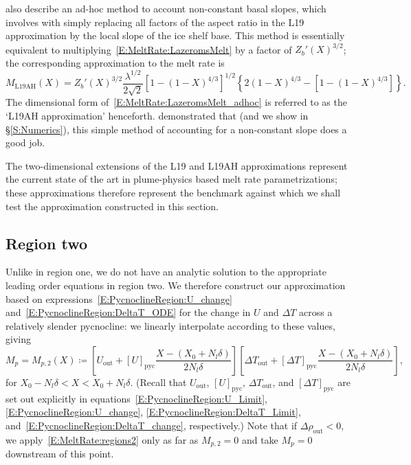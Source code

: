 \documentclass[openacc]{rsproca_new}%
\newcommand{\lt}{\delta} %
\newcommand{\out}{\text{out}}
\begin{document}
\cite{Lazeroms2019JPhysOcean} also describe an ad-hoc method to account non-constant basal slopes, which involves with simply replacing all factors of the aspect ratio in the L19 approximation by the local slope of the ice shelf base. This method is essentially equivalent to multiplying~\eqref{E:MeltRate:LazeromsMelt} by a factor of $Z_b'(X)^{3/2}$; the corresponding approximation to the melt rate is
\begin{equation}\label{E:MeltRate:LazeromsMelt_adhoc}
M_{\text{L19AH}}(X) =Z_b'(X)^{3/2} \frac{\lambda^{1/2}}{2\sqrt{2}}\left[1 - (1 - X)^{4/3}\right]^{1/2}\left\{2(1-X)^{4/3} - \left[1- (1 - X)^{4/3}\right]\right\}.
\end{equation}
The dimensional form of~\eqref{E:MeltRate:LazeromsMelt_adhoc} is referred to as the `L19AH approximation' henceforth. \cite{Lazeroms2019JPhysOcean} demonstrated that (and we show in \S\ref{S:Numerics}), this simple method of accounting for a non-constant slope does a good job. 

The two-dimensional extensions of the L19 and L19AH approximations represent the current state of the art in plume-physics based melt rate parametrizations; these approximations therefore represent the benchmark against which we shall test the approximation constructed in this section.

\subsection{Region two}
Unlike in region one, we do not have an analytic solution to the appropriate leading order equations in region two. We therefore construct our approximation based on expressions~\eqref{E:PycnoclineRegion:U_change} and~\eqref{E:PycnoclineRegion:DeltaT_ODE} for the change in $U$ and $\Delta T$ across a relatively slender pycnocline: we linearly interpolate according to these values, giving
\begin{equation}\label{E:MeltRate:regions2}
M_{p} = M_{p,2}(X) \coloneqq \left[U_{\out} + \left[U\right]_{\text{pyc}} \frac{X - (X_0 + N_l \lt)}{2N_l \lt}\right]  \left[\Delta T_{\out} +  \left[\Delta T\right]_{\text{pyc}} \frac{X - (X_0 + N_l \lt)}{2N_l \lt}\right] , 
\end{equation}
for $ X_0 - N_l \lt  < X < X_0 + N_l \lt$. (Recall that $U_\out$, $\left[U\right]_{\text{pyc}}$, $\Delta T_\out$, and $\left[\Delta T\right]_{\text{pyc}}$ are set out explicitly in equations~\eqref{E:PycnoclineRegion:U_Limit}, \eqref{E:PycnoclineRegion:U_change}, \eqref{E:PycnoclineRegion:DeltaT_Limit}, and~\eqref{E:PycnoclineRegion:DeltaT_change}, respectively.) Note that if $\Delta \rho_\out < 0$, we apply~\eqref{E:MeltRate:regions2} only as far as $M_{p,2} = 0$ and take $M_{p} = 0$ downstream of this point.
\end{document}

